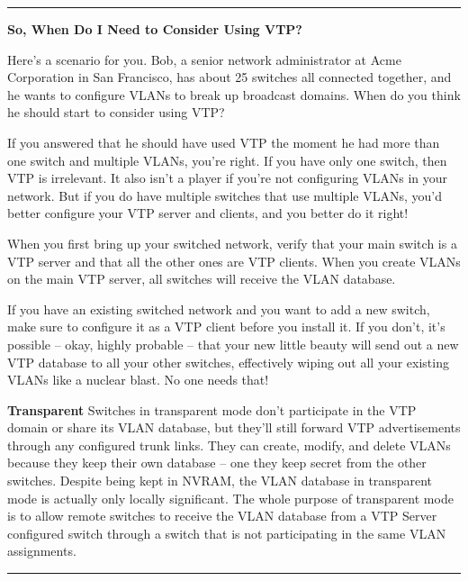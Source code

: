 \begin{center}\rule{0.5\linewidth}{0.5pt}\end{center}

\textbf{So, When Do I Need to Consider Using VTP?}

Here's a scenario for you. Bob, a senior network administrator at Acme
Corporation in San Francisco, has about 25 switches all connected
together, and he wants to configure VLANs to break up broadcast domains.
When do you think he should start to consider using VTP?

If you answered that he should have used VTP the moment he had more than
one switch and multiple VLANs, you're right. If you have only one
switch, then VTP is irrelevant. It also isn't a player if you're not
configuring VLANs in your network. But if you do have multiple switches
that use multiple VLANs, you'd better configure your VTP server and
clients, and you better do it right!

When you first bring up your switched network, verify that your main
switch is a VTP server and that all the other ones are VTP clients. When
you create VLANs on the main VTP server, all switches will receive the
VLAN database.

If you have an existing switched network and you want to add a new
switch, make sure to configure it as a VTP client before you install it.
If you don't, it's possible -- okay, highly probable -- that your new
little beauty will send out a new VTP database to all your other
switches, effectively wiping out all your existing VLANs like a nuclear
blast. No one needs that!

\textbf{Transparent}
Switches in transparent mode don't participate in the VTP domain or
share its VLAN database, but they'll still forward VTP advertisements
through any configured trunk links. They can create, modify, and delete
VLANs because they keep their own database -- one they keep secret from
the other switches. Despite being kept in NVRAM, the VLAN database in
transparent mode is actually only locally significant. The whole purpose
of transparent mode is to allow remote switches to receive the VLAN
database from a VTP Server configured switch through a switch that is
not participating in the same VLAN assignments.

\begin{center}\rule{0.5\linewidth}{0.5pt}\end{center}

